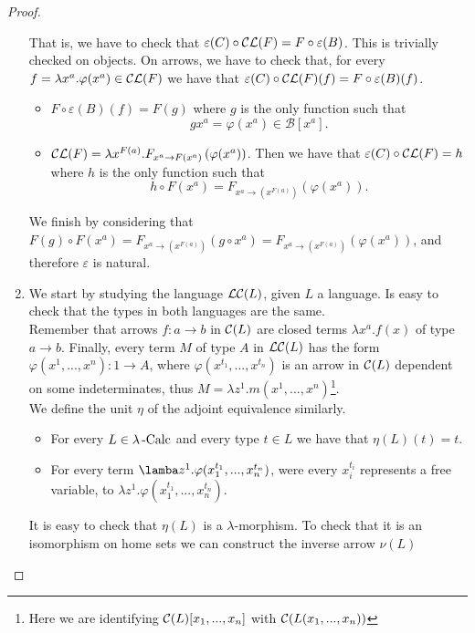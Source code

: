 \begin{proof}
\begin{enumerate}
    That is, we have to check that $\varepsilon(C)\circ \mathcal{C}\mathcal{L}(F) = F \circ \varepsilon(B)$. This is trivially checked on objects. On arrows, we have to check that, for every $f = \lambda x^a.\varphi(x^a) \in \mathcal{C}\mathcal{L}(F) $ we have that $\varepsilon(C)\circ \mathcal{C}\mathcal{L}(F) (f)= F \circ \varepsilon(B)(f)$.

    \begin{itemize}
    \item  $F \circ \varepsilon(B)(f) = F(g)$ where $g$ is the only function  such that$$gx^a = \varphi(x^a) \in \mathcal B[x^a].$$
    \item $\mathcal{C}\mathcal{L}(F) = \lambda x^{F(a)}.F_{x^a\to F(x^a)} \left ( \varphi(x^a)\right )$. Then we have that $\varepsilon(C)\circ \mathcal{C}\mathcal{L}(F) = h$ where $h$ is the only function such that $$h\circ F(x^a) = F_{x^a\to (x^{F(a)})}\left ( \varphi(x^a)\right ).$$
    \end{itemize}
    We finish by considering that $F(g)\circ F(x^a) = F_{x^a\to (x^{F(a)})}(g \circ x^a) = F_{x^a\to (x^{F(a)})}(\varphi(x^a)) $, and therefore $\varepsilon$ is natural.\\

  \item[\fbox{$ 1_{\mathcal A}\cong \LL \CC $}] We start by studying the language $\mathcal{L}\mathcal{C}(L)$, given $L$ a language. Is easy to check that the types in both languages are the same.\\

    Remember that arrows $f:a\to b$ in $\mathcal{C}(L)$ are closed terms $\lambda x^a.f(x)$ of type $a\to b$. Finally, every term $M$ of type $A$ in $\mathcal{L}\mathcal{C}(L)$ has the form $\varphi(x^1,...,x^n): 1 \to A$, where $\varphi(x^{t_1},...,x^{t_n})$ is an arrow in $\mathcal{C}(L)$ dependent on some indeterminates, thus $M =\lambda z^1.m(x^1,...,x^n)$\footnote{Here we are identifying $\mathcal{C}(L)[x_1,...,x_n]$ with $\mathcal{C}(L(x_1,...,x_n))$}.\\


    We define the unit $\eta$ of the adjoint equivalence similarly.
    \begin{itemize}
    \item For every $L\in \lambda\operatorname{-Calc}$ and every type $t\in L$ we have that $\eta(L)(t) = t$.
    \item For every term $\lamba z^1.\varphi (x_1^{t_1},...,x_n^{t_n})$, were every $x_i^{t_i}$ represents a free variable, to $\lambda z^1. \varphi (x_1^{t_1},...,x_n^{t_n}).$
    \end{itemize}


    It is easy to check that $\eta(L)$ is a $\lambda$-morphism. To check that it is an isomorphism on home sets we can construct the inverse arrow $\nu(L)$


\end{enumerate}
\end{proof}
